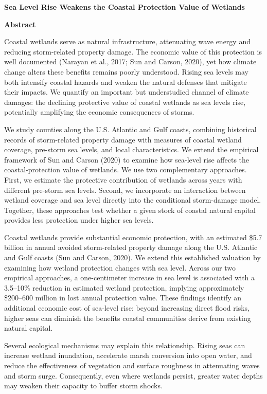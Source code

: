 \documentclass[12pt,a4paper]{article}
\begin{document}
{\centering\large\bfseries Sea Level Rise Weakens the Coastal Protection Value of Wetlands\par}
\vspace{\baselineskip}
\noindent\textbf{Abstract}\par
\vspace{0.25em}
\noindent
Coastal wetlands serve as natural infrastructure, attenuating wave energy and reducing storm-related property damage. The economic value of this protection is well documented (Narayan et al., 2017; Sun and Carson, 2020), yet how climate change alters these benefits remains poorly understood. Rising sea levels may both intensify coastal hazards and weaken the natural defenses that mitigate their impacts. We quantify an important but understudied channel of climate damages: the declining protective value of coastal wetlands as sea levels rise, potentially amplifying the economic consequences of storms.

We study counties along the U.S. Atlantic and Gulf coasts, combining historical records of storm-related property damage with measures of coastal wetland coverage, pre-storm sea levels, and local characteristics. We extend the empirical framework of Sun and Carson (2020) to examine how sea-level rise affects the coastal-protection value of wetlands. We use two complementary approaches. First, we estimate the protective contribution of wetlands across years with different pre-storm sea levels. Second, we incorporate an interaction between wetland coverage and sea level directly into the conditional storm-damage model. Together, these approaches test whether a given stock of coastal natural capital provides less protection under higher sea levels.

Coastal wetlands provide substantial economic protection, with an estimated \$5.7 billion in annual avoided storm-related property damage along the U.S. Atlantic and Gulf coasts (Sun and Carson, 2020). We extend this established valuation by examining how wetland protection changes with sea level. Across our two empirical approaches, a one-centimeter increase in sea level is associated with a 3.5--10\% reduction in estimated wetland protection, implying approximately \$200--600 million in lost annual protection value. These findings identify an additional economic cost of sea-level rise: beyond increasing direct flood risks, higher seas can diminish the benefits coastal communities derive from existing natural capital.

Several ecological mechanisms may explain this relationship. Rising seas can increase wetland inundation, accelerate marsh conversion into open water, and reduce the effectiveness of vegetation and surface roughness in attenuating waves and storm surge. Consequently, even where wetlands persist, greater water depths may weaken their capacity to buffer storm shocks.
\end{document}

